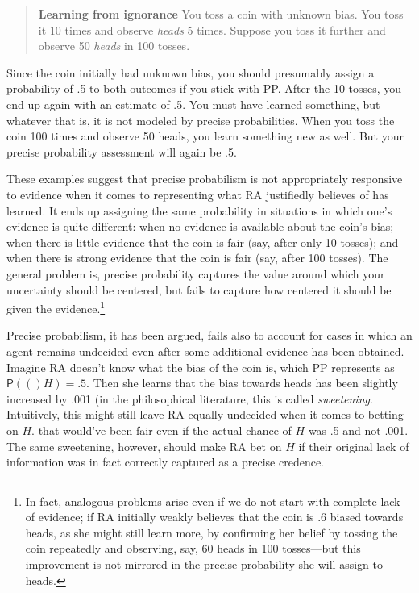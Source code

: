\documentclass[
  letterpaper,
  DIV=11,
  numbers=noendperiod]{scrartcl}
\newcommand{\pr}[1]{\mathsf{P}(#1)}
\begin{document}
\begin{quote}
\textbf{Learning from ignorance}
You toss a coin with unknown bias. You toss it 10 times and observe \emph{heads} 5 times. Suppose you toss it further and observe 50 \emph{heads} in 100 tosses. 
\end{quote}

\noindent Since the coin initially had unknown bias, you should
presumably assign a probability of .5 to both outcomes if you stick with
\textsf{PP}. After the 10 tosses, you end up again with an estimate of
.5. You must have learned something, but whatever that is, it is not
modeled by precise probabilities. When you toss the coin 100 times and
observe 50 heads, you learn something new as well. But your precise
probability assessment will again be .5.

These examples suggest that precise probabilism is not appropriately
responsive to evidence when it comes to representing what RA justifiedly
believes of has learned. It ends up assigning the same probability in
situations in which one's evidence is quite different: when no evidence
is available about the coin's bias; when there is little evidence that
the coin is fair (say, after only 10 tosses); and when there is strong
evidence that the coin is fair (say, after 100 tosses). The general
problem is, precise probability captures the value around which your
uncertainty should be centered, but fails to capture how centered it
should be given the evidence.\footnote{In fact, analogous problems arise
  even if we do not start with complete lack of evidence; if RA
  initially weakly believes that the coin is .6 biased towards heads, as
  she might still learn more, by confirming her belief by tossing the
  coin repeatedly and observing, say, 60 heads in 100 tosses---but this
  improvement is not mirrored in the precise probability she will assign
  to heads.}

Precise probabilism, it has been argued, fails also to account for cases
in which an agent remains undecided even after some additional evidence
has been obtained. Imagine RA doesn't know what the bias of the coin is,
which PP represents as \(\pr(H)= .5\). Then she learns that the bias
towards heads has been slightly increased by .001 (in the philosophical
literature, this is called \emph{sweetening}. Intuitively, this might
still leave RA equally undecided when it comes to betting on \(H\). that
would've been fair even if the actual chance of \(H\) was .5 and not
.001. The same sweetening, however, should make RA bet on \(H\) if their
original lack of information was in fact correctly captured as a precise
credence.
\end{document}
